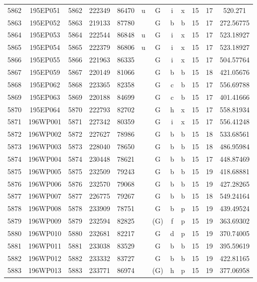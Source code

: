 \begin{tabular}{|*{12}{c|}}
5862 & 195EP051 & 5862 & 222349 & 86470 & u & G & i & x & 15 & 17 & 520.271 \\ 
5863 & 195EP052 & 5863 & 219133 & 87780 &  & G & b & b & 15 & 17 & 272.56775 \\ 
5864 & 195EP053 & 5864 & 222544 & 86848 & u & G & i & x & 15 & 17 & 523.18927 \\ 
5865 & 195EP054 & 5865 & 222379 & 86806 & u & G & i & x & 15 & 17 & 523.18927 \\ 
5866 & 195EP055 & 5866 & 221963 & 86335 &  & G & i & x & 15 & 17 & 504.57764 \\ 
5867 & 195EP059 & 5867 & 220149 & 81066 &  & G & b & b & 15 & 18 & 421.05676 \\ 
5868 & 195EP062 & 5868 & 223365 & 82358 &  & G & c & b & 15 & 17 & 556.69788 \\ 
5869 & 195EP063 & 5869 & 220188 & 84699 &  & G & c & b & 15 & 17 & 401.41666 \\ 
5870 & 195EP064 & 5870 & 222793 & 82702 &  & G & h & x & 15 & 17 & 558.81934 \\ 
5871 & 196WP001 & 5871 & 227342 & 80359 &  & G & i & x & 15 & 17 & 556.41248 \\ 
5872 & 196WP002 & 5872 & 227627 & 78986 &  & G & b & b & 15 & 18 & 533.68561 \\ 
5873 & 196WP003 & 5873 & 228040 & 78650 &  & G & b & b & 15 & 18 & 486.95984 \\ 
5874 & 196WP004 & 5874 & 230448 & 78621 &  & G & b & b & 15 & 17 & 448.87469 \\ 
5875 & 196WP005 & 5875 & 232509 & 79243 &  & G & b & b & 15 & 19 & 418.68881 \\ 
5876 & 196WP006 & 5876 & 232570 & 79068 &  & G & b & b & 15 & 19 & 427.28265 \\ 
5877 & 196WP007 & 5877 & 226775 & 79267 &  & G & b & b & 15 & 18 & 549.24164 \\ 
5878 & 196WP008 & 5878 & 233909 & 78751 &  & G & b & p & 15 & 19 & 439.49524 \\ 
5879 & 196WP009 & 5879 & 232594 & 82825 &  & (G) & f & p & 15 & 19 & 363.69302 \\ 
5880 & 196WP010 & 5880 & 232681 & 82217 &  & G & d & p & 15 & 19 & 370.74005 \\ 
5881 & 196WP011 & 5881 & 233038 & 83529 &  & G & b & b & 15 & 19 & 395.59619 \\ 
5882 & 196WP012 & 5882 & 233332 & 83727 &  & G & b & b & 15 & 19 & 422.81165 \\ 
5883 & 196WP013 & 5883 & 233771 & 86974 &  & (G) & h & p & 15 & 19 & 377.06958 \\ 

\end{tabular}
